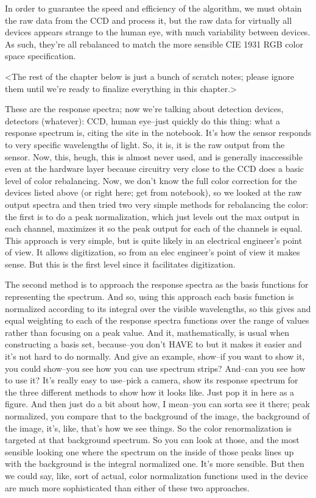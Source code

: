 In order to guarantee the speed and efficiency of the algorithm, we must obtain the raw data from the CCD and process it, but the raw data for virtually all devices appears strange to the human eye, with much variability between devices. As such, they're all rebalanced to match the more sensible CIE 1931 RGB color space specification.


<The rest of the chapter below is just a bunch of scratch notes; please ignore them until we're ready to finalize everything in this chapter.>




These are the response spectra; now we're talking about detection devices, detectors (whatever): CCD, human eye--just quickly do this thing: what a response spectrum is, citing the site in the notebook. It's how the sensor responds to very specific wavelengths of light. So, it is, it is the raw output from the sensor. Now, this, heugh, this is almost never used, and is generally inaccessible even at the hardware layer because circuitry very close to the CCD does a basic level of color rebalancing. Now, we don't know the full color correction for the devices listed above (or right here; get from notebook), so we looked at the raw output spectra and then tried two very simple methods for rebalancing the color: the first is to do a peak normalization, which just levels out the max output in each channel, maximizes it so the peak output for each of the channels is equal. This approach is very simple, but is quite likely in an electrical engineer's point of view. It allows digitization, so from an elec engineer's point of view it makes sense. But this is the first level since it facilitates digitization. 

The second method is to approach the response spectra as the basis functions for representing the spectrum. And so, using this approach each basis function is normalized according to its integral over the visible wavelengths, so this gives and equal weighting to each of the response spectra functions over the range of values rather than focusing on a peak value. And it, mathematically, is usual when constructing a basis set, because--you don't HAVE to but it makes it easier and it's not hard to do normally. And give an example, show--if you want to show it, you could show--you see how you can use spectrum strips? And--can you see how to use it? It's really easy to use--pick a camera, show its response spectrum for the three different methods to show how it looks like. Just pop it in here as a figure. And then just do a bit about how, I mean--you can sorta see it there; peak normalized, you compare that to the background of the image, the background of the image, it's, like, that's how we see things. So the color renormalization is targeted at that background spectrum. So you can look at those, and the most sensible looking one where the spectrum on the inside of those peaks lines up with the background is the integral normalized one. It's more sensible. But then we could say, like, sort of actual, color normalization functions used in the device are much more sophisticated than either of these two approaches. 

